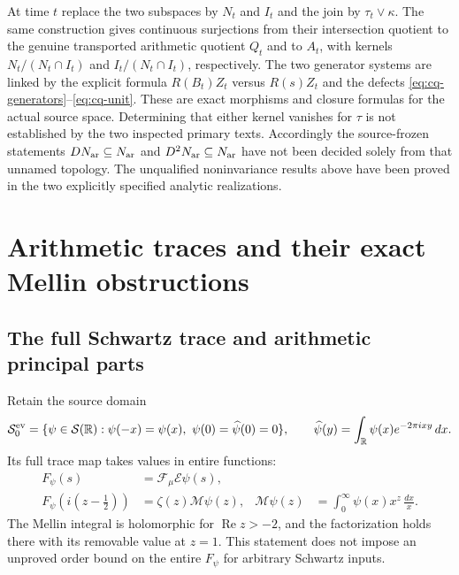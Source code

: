 At time $t$ replace the two subspaces by $N_t$ and $I_t$ and the
join by $\tau_t\vee\kappa$. The same construction gives continuous
surjections from their intersection quotient to the genuine transported
arithmetic quotient $Q_t$ and to $A_t$, with kernels
$N_t/(N_t\cap I_t)$ and $I_t/(N_t\cap I_t)$, respectively.
The two generator systems are linked by the explicit formula
$R(B_t)Z_t$ versus $R(s)Z_t$ and the defects
\eqref{eq:cq-generators}--\eqref{eq:cq-unit}.
These are exact morphisms and closure formulas for the actual source
space. Determining that either kernel vanishes for $\tau$ is not
established by the two inspected primary texts. Accordingly the
source-frozen statements $DN_{\rm ar}\subseteq N_{\rm ar}$ and
$D^2N_{\rm ar}\subseteq N_{\rm ar}$ have not been decided solely from that
unnamed topology. The unqualified noninvariance results above have
been proved in the two explicitly specified analytic realizations.

\section{Arithmetic traces and their exact Mellin obstructions}
\label{sec:cq-arithmetic}
\subsection{The full Schwartz trace and arithmetic principal parts}
\label{sec:cq-principalparts}
Retain the source domain
\[
 \mathcal S_0^{\rm ev}
 =\{\psi\in\mathcal S(\mathbb R):
       \psi(-x)=\psi(x),\ \psi(0)=\widehat\psi(0)=0\},
 \qquad
 \widehat\psi(y)=\int_{\mathbb R}\psi(x)e^{-2\pi ixy}\,dx.
\]
Its full trace map takes values in entire functions:
\begin{equation}\label{eq:cq-Schwartz-trace}
 \begin{aligned}
 F_\psi(s)&=\mathcal F_\mu\mathcal E\psi(s),\\
 F_\psi(i(z-\tfrac12))&=\zeta(z)\mathcal M\psi(z),
 &\mathcal M\psi(z)&=\int_0^\infty\psi(x)x^z\,\frac{dx}{x}.
 \end{aligned}
\end{equation}
The Mellin integral is holomorphic for $\operatorname{Re}z>-2$,
and the factorization holds there with its removable value at
$z=1$. This statement does not impose an unproved order bound
on the entire $F_\psi$ for arbitrary Schwartz inputs.

